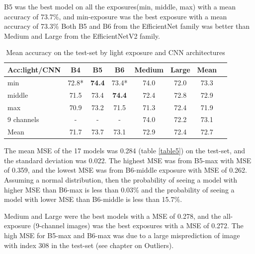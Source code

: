 \documentclass[10pt,letterpaper]{article}
\begin{document}
B5 was the best model on all the exposures(min, middle, max) with a mean accuracy of 73.7\%,
and min-exposure was the best exposure with a mean accuracy of 73.3\%
Both B5 and B6 from the EfficientNet family was better than 
Medium and Large from the EfficientNetV2 family.

\begin{table}[hbt!]
\caption{Mean accuracy on the test-set by light exposure and CNN architectures}
\begin{tabular}{ |l|c|c|c|c|c|c|c|} \hline
    Acc:light/CNN & B4 & B5 & B6 & Medium & Large & Mean \\ \hline
    min        & 72.8* & {\bf 74.4} & 73.4*      & 74.0 & 72.0 & 73.3 \\ 
    middle     & 71.5 & 73.4        & {\bf 74.4} & 72.4 & 72.8 & 72.9 \\ 
    max        & 70.9 & 73.2        & 71.5       & 71.3 & 72.4 & 71.9 \\ 
    9 channels & -    & -           & -          & 74.0 & 72.2 & 73.1 \\  \hline
    Mean       & 71.7 & 73.7        & 73.1       & 72.9 & 72.4 & 72.7 \\  \hline
\end{tabular}
\label{table4}
\end{table}
The mean MSE of the 17 models was 0.284 (table \ref{table5}) on the test-set, and the standard deviation was 0.022.
The highest MSE was from B5-max with MSE of 0.359, and the lowest MSE was from B6-middle exposure with MSE of 0.262.
Assuming a normal distribution, then the probability of seeing 
a model with higher MSE than B6-max is less than 0.03\%
and the probability of seeing a model with lower MSE than
B6-middle is less than 15.7\%.

Medium and Large were the best models with a MSE of 0.278,
and the all-exposure (9-channel images) was the best exposures with a MSE of 0.272.
The high MSE for B5-max and B6-max was due to a large misprediction of image with index 308 in the test-set (see chapter on Outliers).
\end{document}
